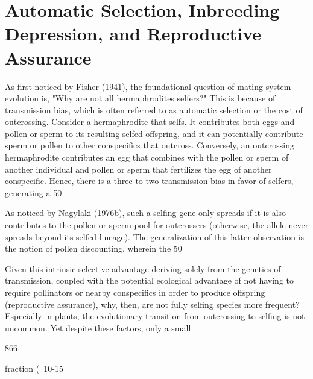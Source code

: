 \documentclass{article}
\begin{document}
\section{Automatic Selection, Inbreeding Depression, and Reproductive Assurance}
As first noticed by Fisher (1941), the foundational question of mating-system evolution is, "Why are not all hermaphrodites selfers?" This is because of transmission bias, which is often referred to as automatic selection or the cost of outcrossing. Consider a hermaphrodite that selfs. It contributes both eggs and pollen or sperm to its resulting selfed offspring, and it can potentially contribute sperm or pollen to other conspecifics that outcross. Conversely, an outcrossing hermaphrodite contributes an egg that combines with the pollen or sperm of another individual and pollen or sperm that fertilizes the egg of another conspecific. Hence, there is a three to two transmission bias in favor of selfers, generating a 50%

As noticed by Nagylaki (1976b), such a selfing gene only spreads if it is also contributes to the pollen or sperm pool for outcrossers (otherwise, the allele never spreads beyond its selfed lineage). The generalization of this latter observation is the notion of pollen discounting, wherein the 50%

Given this intrinsic selective advantage deriving solely from the genetics of transmission, coupled with the potential ecological advantage of not having to require pollinators or nearby conspecifics in order to produce offspring (reproductive assurance), why, then, are not fully selfing species more frequent? Especially in plants, the evolutionary transition from outcrossing to selfing is not uncommon. Yet despite these factors, only a small

866

fraction (~10-15%
\end{document}
